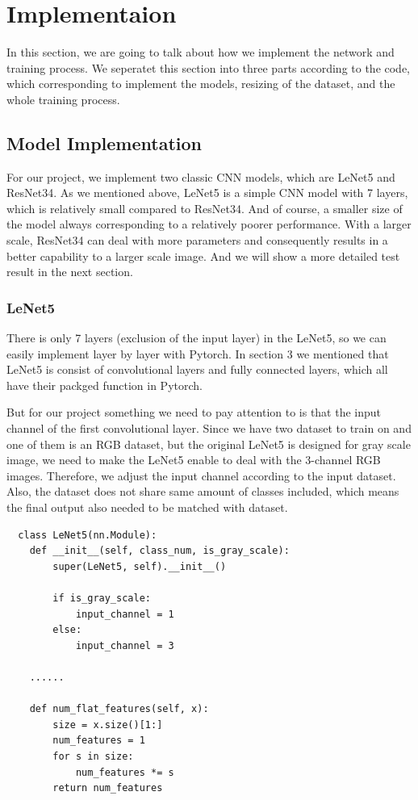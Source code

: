 \documentclass[12pt]{article}
\begin{document}
\section{Implementaion}
In this section, we are going to talk about how we implement the network and training process. We seperatet this section into three parts according to the code, which corresponding to implement the models, resizing of the dataset, and the whole training process.
\subsection{Model Implementation}
For our project, we implement two classic CNN models, which are LeNet5 and ResNet34. As we mentioned above, LeNet5 is a simple CNN model with 7 layers, which is relatively small compared to ResNet34. And of course, a smaller size of the model always corresponding to a relatively poorer performance. With a larger scale, ResNet34 can deal with more parameters and consequently results in a better capability to a larger scale image. And we will show a more detailed test result in the next section.
\subsubsection*{LeNet5}
There is only 7 layers (exclusion of the input layer) in the LeNet5, so we can easily implement layer by layer with Pytorch. In section 3 we mentioned that LeNet5 is consist of convolutional layers and fully connected layers, which all have their packged function in Pytorch. 

But for our project something we need to pay attention to is that the input channel of the first convolutional layer. Since we have two dataset to train on and one of them is an RGB dataset, but the original LeNet5 is designed for gray scale image, we need to make the LeNet5 enable to deal with the 3-channel RGB images. Therefore, we adjust the input channel according to the input dataset. Also, the dataset does not share same amount of classes included, which means the final output also needed to be matched with dataset.

\begin{lstlisting}
  class LeNet5(nn.Module):
    def __init__(self, class_num, is_gray_scale):
        super(LeNet5, self).__init__()

        if is_gray_scale:
            input_channel = 1
        else:
            input_channel = 3

    ......

    def num_flat_features(self, x):
        size = x.size()[1:]
        num_features = 1
        for s in size:
            num_features *= s
        return num_features
\end{lstlisting}
\end{document}
